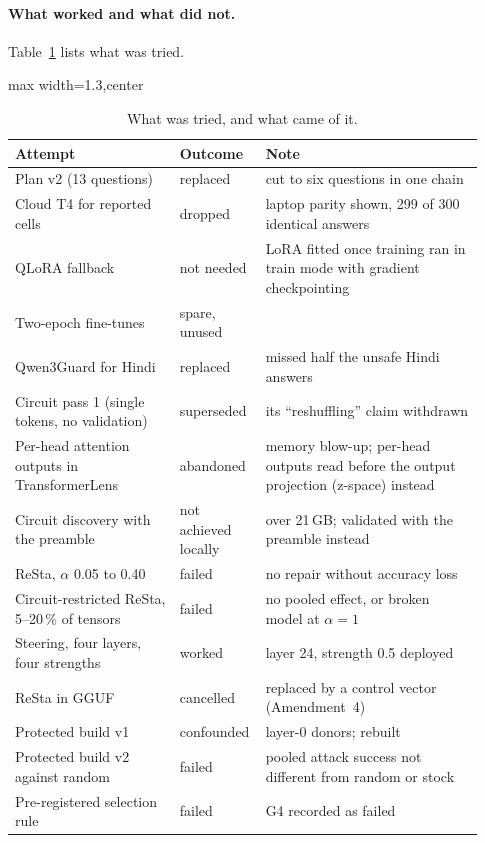\paragraph{What worked and what did not.} Table~\ref{tab:tried} lists what was tried.

\begin{table}[tbp]
\centering
\caption{What was tried, and what came of it.}\label{tab:tried}
\scriptsize
\begin{adjustbox}{max width=1.3\linewidth,center}
\begin{tabular}{>{\raggedright\arraybackslash}p{0.34\linewidth}>{\raggedright\arraybackslash}p{0.14\linewidth}>{\raggedright\arraybackslash}p{0.45\linewidth}}
\toprule
Attempt & Outcome & Note \\
\midrule
Plan v2 (13 questions) & replaced & cut to six questions in one chain \\
Cloud T4 for reported cells & dropped & laptop parity shown, 299 of 300 identical answers \\
QLoRA fallback & not needed & LoRA fitted once training ran in train mode with gradient checkpointing \\
Two-epoch fine-tunes & spare, unused & \\
Qwen3Guard for Hindi & replaced & missed half the unsafe Hindi answers \\
Circuit pass 1 (single tokens, no validation) & superseded & its ``reshuffling'' claim withdrawn \\
Per-head attention outputs in TransformerLens & abandoned & memory blow-up; per-head outputs read before the output projection (z-space) instead \\
Circuit discovery with the preamble & not achieved locally & over 21\,GB; validated with the preamble instead \\
ReSta, $\alpha$ 0.05 to 0.40 & failed & no repair without accuracy loss \\
Circuit-restricted ReSta, 5--20\,\% of tensors & failed & no pooled effect, or broken model at $\alpha=1$ \\
Steering, four layers, four strengths & worked & layer 24, strength 0.5 deployed \\
ReSta in GGUF & cancelled & replaced by a control vector (Amendment~4) \\
Protected build v1 & confounded & layer-0 donors; rebuilt \\
Protected build v2 against random & failed & pooled attack success not different from random or stock \\
Pre-registered selection rule & failed & G4 recorded as failed \\
\bottomrule
\end{tabular}
\end{adjustbox}
\end{table}

